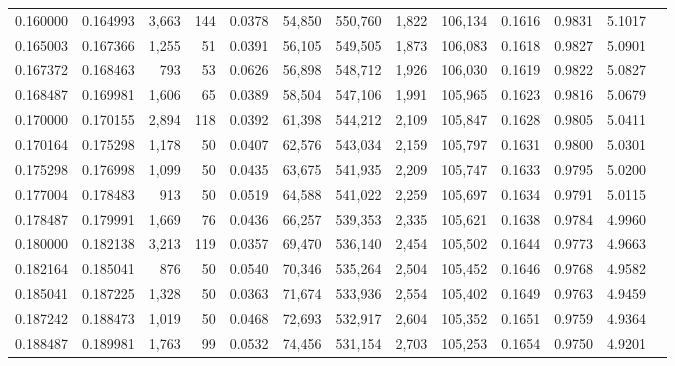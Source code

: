 \begin{tabular}{rrrrrrrrrrrrr}
0.160000 & 0.164993 & 3,663 & 144 &                                     0.0378 &  54,850 & 550,760 &   1,822 & 106,134 & 0.1616 & 0.9831 & 5.1017 \\
0.165003 & 0.167366 & 1,255 &  51 &                                     0.0391 &  56,105 & 549,505 &   1,873 & 106,083 & 0.1618 & 0.9827 & 5.0901 \\
0.167372 & 0.168463 &   793 &  53 &                                     0.0626 &  56,898 & 548,712 &   1,926 & 106,030 & 0.1619 & 0.9822 & 5.0827 \\
0.168487 & 0.169981 & 1,606 &  65 &                                     0.0389 &  58,504 & 547,106 &   1,991 & 105,965 & 0.1623 & 0.9816 & 5.0679 \\
0.170000 & 0.170155 & 2,894 & 118 &                                     0.0392 &  61,398 & 544,212 &   2,109 & 105,847 & 0.1628 & 0.9805 & 5.0411 \\
0.170164 & 0.175298 & 1,178 &  50 &                                     0.0407 &  62,576 & 543,034 &   2,159 & 105,797 & 0.1631 & 0.9800 & 5.0301 \\
0.175298 & 0.176998 & 1,099 &  50 &                                     0.0435 &  63,675 & 541,935 &   2,209 & 105,747 & 0.1633 & 0.9795 & 5.0200 \\
0.177004 & 0.178483 &   913 &  50 &                                     0.0519 &  64,588 & 541,022 &   2,259 & 105,697 & 0.1634 & 0.9791 & 5.0115 \\
0.178487 & 0.179991 & 1,669 &  76 &                                     0.0436 &  66,257 & 539,353 &   2,335 & 105,621 & 0.1638 & 0.9784 & 4.9960 \\
0.180000 & 0.182138 & 3,213 & 119 &                                     0.0357 &  69,470 & 536,140 &   2,454 & 105,502 & 0.1644 & 0.9773 & 4.9663 \\
0.182164 & 0.185041 &   876 &  50 &                                     0.0540 &  70,346 & 535,264 &   2,504 & 105,452 & 0.1646 & 0.9768 & 4.9582 \\
0.185041 & 0.187225 & 1,328 &  50 &                                     0.0363 &  71,674 & 533,936 &   2,554 & 105,402 & 0.1649 & 0.9763 & 4.9459 \\
0.187242 & 0.188473 & 1,019 &  50 &                                     0.0468 &  72,693 & 532,917 &   2,604 & 105,352 & 0.1651 & 0.9759 & 4.9364 \\
0.188487 & 0.189981 & 1,763 &  99 &                                     0.0532 &  74,456 & 531,154 &   2,703 & 105,253 & 0.1654 & 0.9750 & 4.9201 \\

\end{tabular}
